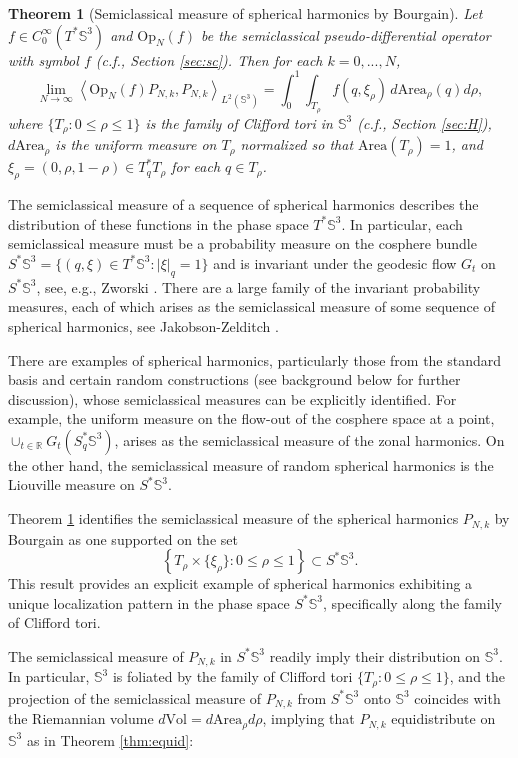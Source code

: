 \documentclass[12pt,reqno]{amsart}
\newcommand\Area{\mathrm{Area}}
\newcommand\Op{\mathrm{Op}}
\newcommand\R{\mathbb{R}}
\newcommand\Sb{\mathbb{S}}
\newcommand\Vol{\mathrm{Vol}}
\theoremstyle{plain}
\newtheorem{thm}{Theorem}
\theoremstyle{remark}
\numberwithin{equation}{section}
\begin{document}
\begin{thm}[Semiclassical measure of spherical harmonics by Bourgain]\label{thm:sc}
Let $f\in C^\infty_0(T^*\Sb^3)$ and $\Op_N(f)$ be the semiclassical pseudo-differential operator with symbol $f$ (c.f., Section \ref{sec:sc}). Then for each $k=0,...,N$,
$$\lim_{N\to\infty}\left\langle\Op_N(f)P_{N,k},P_{N,k}\right\rangle_{L^2(\Sb^3)}=\int_0^1\int_{T_\rho}f\left(q,\xi_\rho\right)\,d\Area_\rho(q)d\rho,$$
where $\{T_\rho:0\le\rho\le1\}$ is the family of Clifford tori in $\Sb^3$ (c.f., Section \ref{sec:H}), $d\Area_\rho$ is the uniform measure on $T_\rho$ normalized so that $\Area(T_\rho)=1$, and $\xi_\rho=(0,\rho,1-\rho)\in T_q^*T_\rho$ for each $q\in T_\rho$.
\end{thm}

The semiclassical measure of a sequence of spherical harmonics describes the distribution of these functions in the phase space $T^*\Sb^3$. In particular, each semiclassical measure must be a probability measure on the cosphere bundle $S^*\Sb^3=\{(q,\xi)\in T^*\Sb^3:|\xi|_q=1\}$ and is invariant under the geodesic flow $G_t$ on $S^*\Sb^3$, see, e.g., Zworski \cite[Section 4.2]{Zw}. There are a large family of the invariant probability measures, each of which arises as the semiclassical measure of some sequence of spherical harmonics, see Jakobson-Zelditch \cite{JZ}. 

There are examples of spherical harmonics, particularly those from the standard basis and certain random constructions (see background below for further discussion), whose semiclassical measures can be explicitly identified. For example, the uniform measure on the flow-out of the cosphere space at a point, $\cup_{t\in\R}G_t(S_q^*\Sb^3)$, arises as the semiclassical measure of the zonal harmonics. On the other hand, the semiclassical measure of random spherical harmonics is the Liouville measure on $S^*\Sb^3$. 

Theorem \ref{thm:sc} identifies the semiclassical measure of the spherical harmonics $P_{N,k}$ by Bourgain as one supported on the set 
$$\left\{T_\rho\times\{\xi_\rho\}:0\le\rho\le1\right\}\subset S^*\Sb^3.$$ 
This result provides an explicit example of spherical harmonics exhibiting a unique localization pattern in the phase space $S^*\Sb^3$, specifically along the family of Clifford tori. 

The semiclassical measure of $P_{N,k}$ in $S^*\Sb^3$ readily imply their distribution on $\Sb^3$. In particular, $\Sb^3$ is foliated by the family of Clifford tori $\{T_\rho:0\le\rho\le1\}$, and the projection of the semiclassical measure of $P_{N,k}$ from $S^*\Sb^3$ onto $\Sb^3$ coincides with the Riemannian volume $d\Vol=d\Area_\rho d\rho$, implying that $P_{N,k}$ equidistribute on $\Sb^3$ as in Theorem \ref{thm:equid}:
\end{document}
